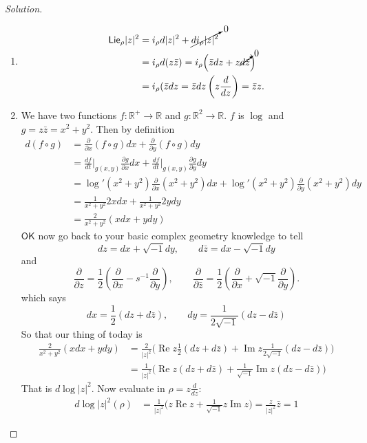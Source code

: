 \begin{proof}[Solution]\leavevmode
\begin{enumerate}[label=(\alph*)]
\item
	 \begin{align*}
	\mathsf{Lie}_\rho |z|^2&=i_\rho d |z|^2 +\cancelto{0}{di_\rho |z|^2}\\
	&=i_\rho d(z \bar{z})=i_\rho \Big(\bar{z}dz +z \cancelto{0}{d \bar{z}} \Big)\\
	&=i_\rho( \bar{z}dz=\bar{z}dz\left(z \frac{d}{dz}\right) =\bar{z}z.
	\end{align*}

\item We have two functions \(f:\mathbb{R}^+ \to \mathbb{R}\) and \(g:\mathbb{R}^2 \to \mathbb{R}\). \(f\) is \(\operatorname{log}\) and \(g=z \bar{z}=x^2+y^2\). Then by definition
\begin{align*}
d(f \circ g)&=\frac{\partial }{\partial x}(f \circ g)dx+ \frac{\partial }{\partial y}(f \circ g) dy\\
&=\frac{df}{dt}\Big|_{g(x,y)}\frac{\partial g}{\partial x}dx+\frac{df}{dt}\Big|_{g(x,y)}\frac{\partial g}{\partial y}dy\\
&=\operatorname{log}'(x^2+y^2)\frac{\partial }{\partial x}(x^2+y^2)dx+\operatorname{log}'(x^2+y^2)\frac{\partial }{\partial y}(x^2+y^2)dy\\
&=\frac{1}{x^2+y^2}2xdx+\frac{1}{x^2+y^2}2ydy\\
&=\frac{2}{x^2+y^2}(xdx+ydy)
\end{align*}
$\mathsf{OK}$ now go back to your basic complex geometry knowledge to tell
\[dz=dx+\sqrt{-1}dy,\qquad d\bar{z}=dx-\sqrt{-1}dy\]
and
\[\frac{\partial }{\partial z}=\frac{1}{2}\left(\frac{\partial }{\partial x}-s^{-1}\frac{\partial }{\partial y}\right) ,\qquad \frac{\partial }{\partial \bar{z}}=\frac{1}{2}\left(\frac{\partial }{\partial x}+\sqrt{-1}\frac{\partial }{\partial y}\right) .\]
which says
\[dx=\frac{1}{2}\left(dz+d\bar{z}\right) ,\qquad dy=\frac{1}{2\sqrt{-1}}(dz-d\bar{z})\]
So that our thing of today is
\begin{align*}
\frac{2}{x^2+y^2}(xdx+ydy)&=\frac{2}{|z|^2}\Big(\operatorname{Re}z\frac{1}{2}(dz+d\bar{z})+\operatorname{Im}z\frac{1}{2\sqrt{-1}}(dz-d\bar{z})\Big)\\
			  &=\frac{1}{|z|^2}\Big(\operatorname{Re}z(dz +d\bar{z})+\frac{1}{\sqrt{-1}}\operatorname{Im}z(dz-d\bar{z})\Big)
\end{align*}
That is  \(d \operatorname{log}|z|^2\). Now evaluate in \(\rho=z\frac{d}{dz}\):
\begin{align*}
d\operatorname{log}|z|^2(\rho)&=\frac{1}{|z|^2}\Big(z\operatorname{Re}z+\frac{1}{\sqrt{-1}}z\operatorname{Im}z\Big)=\frac{z}{|z|^2}\bar{z}=1
\end{align*}


\end{enumerate}
\end{proof}


